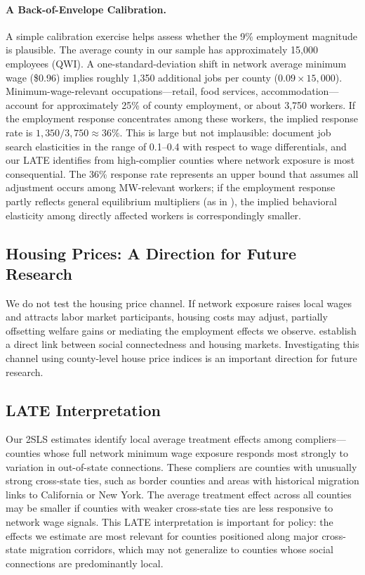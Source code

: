 \documentclass[12pt]{article}
\begin{document}
\paragraph{A Back-of-Envelope Calibration.} A simple calibration exercise helps assess whether the 9\% employment magnitude is plausible. The average county in our sample has approximately 15,000 employees (QWI). A one-standard-deviation shift in network average minimum wage (\$0.96) implies roughly 1,350 additional jobs per county ($0.09 \times 15{,}000$). Minimum-wage-relevant occupations---retail, food services, accommodation---account for approximately 25\% of county employment, or about 3,750 workers. If the employment response concentrates among these workers, the implied response rate is $1{,}350 / 3{,}750 \approx 36\%$. This is large but not implausible: \citet{faberman2022} document job search elasticities in the range of 0.1--0.4 with respect to wage differentials, and our LATE identifies from high-complier counties where network exposure is most consequential. The 36\% response rate represents an upper bound that assumes all adjustment occurs among MW-relevant workers; if the employment response partly reflects general equilibrium multipliers (as in \citealt{moretti2011local}), the implied behavioral elasticity among directly affected workers is correspondingly smaller.

\subsection{Housing Prices: A Direction for Future Research}

We do not test the housing price channel. If network exposure raises local wages and attracts labor market participants, housing costs may adjust, partially offsetting welfare gains \citep{roback1982wages} or mediating the employment effects we observe. \citet{bailey2018house} establish a direct link between social connectedness and housing markets. Investigating this channel using county-level house price indices is an important direction for future research.

\subsection{LATE Interpretation}

Our 2SLS estimates identify local average treatment effects among compliers---counties whose full network minimum wage exposure responds most strongly to variation in out-of-state connections. These compliers are counties with unusually strong cross-state ties, such as border counties and areas with historical migration links to California or New York. The average treatment effect across all counties may be smaller if counties with weaker cross-state ties are less responsive to network wage signals. This LATE interpretation is important for policy: the effects we estimate are most relevant for counties positioned along major cross-state migration corridors, which may not generalize to counties whose social connections are predominantly local.
\end{document}
